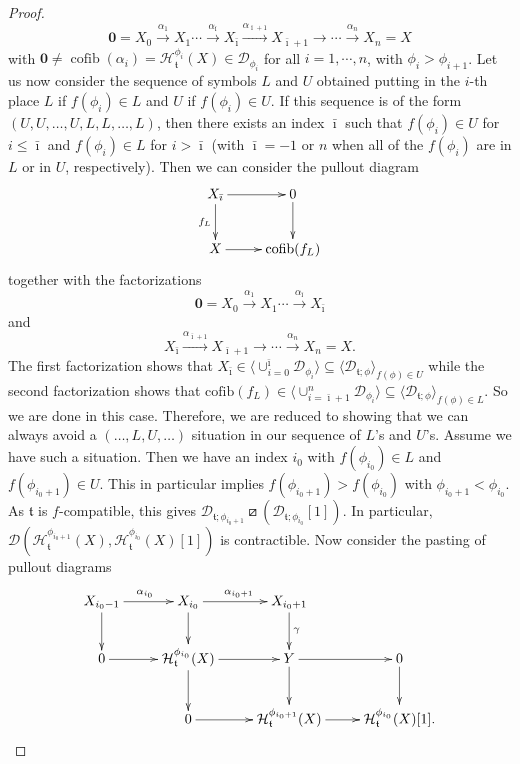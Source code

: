\documentclass{article}
\theoremstyle{definition}
\newcommand{\tee}{\mathfrak{t}}
\newcommand{\orth}{\boxslash}
\DeclareMathOperator{\cofib}{cofib}
\begin{document}
\begin{proof}
\[
\mathbf{0}=X_0 \xrightarrow{\alpha_1} X_1\cdots \xrightarrow{\alpha_{{\bar\imath}}}X_{{\bar\imath}}\xrightarrow{\alpha_{{\bar\imath}+1}}X_{{\bar\imath}+1}\xrightarrow{}\cdots \xrightarrow{\alpha_n} X_n=X
\]
with $\mathbf{0} \neq \cofib(\alpha_i)=\mathcal{H}_{\tee}^{\phi_i}(X) \in \mathscr{D}_{\phi_i}$ for all $i = 1, \cdots, n$, with $\phi_i>\phi_{i+1}$. Let us now consider the sequence of symbols $L$ and $U$ obtained putting in the $i$-th place $L$ if $f(\phi_i)\in L$ and $U$ if $f(\phi_i)\in U$. If this sequence is of the form $(U,U,\dots,U,L,L,\dots,L)$, then there exists an index $\bar{\imath}$ such that
 $f(\phi_{i})\in U$ for $i\leq \bar{\imath}$ and $f(\phi_{i})\in L$ for $i>\bar{\imath}$ (with ${\bar\imath}=-1$ or $n$ when all of the $f(\phi_i)$ are in $L$ or in $U$, respectively). Then we can
consider the pullout diagram
\[
\xymatrix{
X_{{\bar\imath}}\ar[r]\ar[d]_{f_{L}}&0\ar[d]\\
X\ar[r]&\mathrm{cofib}(f_{L})
}\]
together with the factorizations
\[
\mathbf{0}=X_0 \xrightarrow{\alpha_1} X_1\cdots \xrightarrow{\alpha_{{\bar\imath}}}X_{{\bar\imath}} 
\]
and
\[
X_{{\bar\imath}}\xrightarrow{\alpha_{{\bar\imath}+1}}X_{{\bar\imath}+1}\xrightarrow{}\cdots \xrightarrow{\alpha_n} X_n=X.
\]
The first factorization shows that $X_{{\bar\imath}}\in \langle\cup_{i=0}^{{\bar\imath}}\mathscr{D}_{\phi_i}\rangle\subseteq \langle \mathscr{D}_{\tee;\phi}\rangle_{f(\phi)\in U}$ while the second factorization shows that $\mathrm{cofib}(f_{L})\in  \langle\cup_{i={\bar\imath}+1}^n\mathscr{D}_{\phi_i}\rangle\subseteq \langle \mathscr{D}_{\tee;\phi}\rangle_{f(\phi)\in L}$. So we are done in this case. Therefore, we are reduced to showing that we can always avoid a $(\dots,L,U,\dots)$ situation in our sequence of $L$'s and $U$'s. Assume we have such a situation. Then we have an index $i_0$ with $f(\phi_{i_0})\in L$ and $f(\phi_{{i_0}+1})\in U$. This in particular implies $f(\phi_{{i_0}+1})>f(\phi_{i_0})$ with $\phi_{{i_0}+1}<\phi_{i_0}$. As $\tee$ is $f$-compatible, this gives $\mathscr{D}_{\tee; \phi_{i_0+1}}\orth (\mathscr{D}_{\tee;\phi_{i_0}}[1])$. In particular, $\mathscr{D}(\mathcal{H}^{\phi_{i_0+1}}_{\tee}(X),\mathcal{H}^{\phi_{i_0}}_{\tee}(X)[1])$ is contractible. Now consider the pasting of pullout diagrams
\[
\xymatrix{X_{i_0-1}\ar[r]^{\alpha_{i_0}}\ar[d] & X_{i_0}\ar[r]^{\alpha_{i_0+1}}\ar[d] & X_{i_0+1}\ar[d]^{\gamma}\\
0\ar[r]&\mathcal{H}^{\phi_{i_0}}_{\tee}(X)\ar[d]\ar[r]&Y\ar[d]\ar[r] &0\ar[d]\\
&0\ar[r]&\mathcal{H}^{\phi_{i_0+1}}_{\tee}(X)\ar[r]&\mathcal{H}^{\phi_{i_0}}_{\tee}(X)[1].
}\]
\end{proof}
\end{document}
